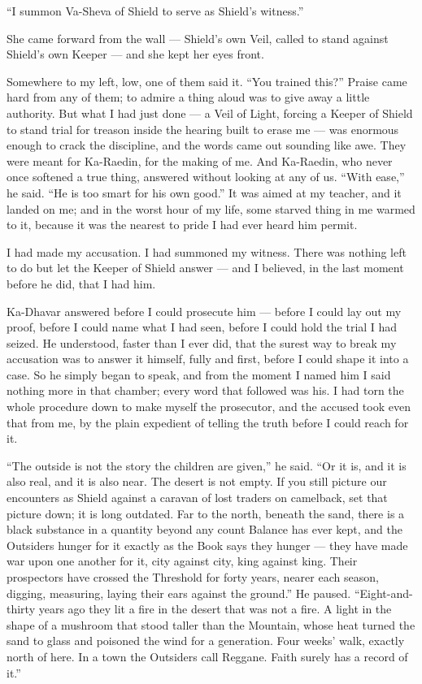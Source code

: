 ``I summon Va-Sheva of Shield to serve as Shield's witness.''\par
 
She came forward from the wall --- Shield's own Veil, called to stand against Shield's own Keeper --- and she kept her eyes front. \par
 
Somewhere to my left, low, one of them said it. ``You trained this?'' Praise came hard from any of them; to admire a thing aloud was to give away a little authority. But what I had just done --- a Veil of Light, forcing a Keeper of Shield to stand trial for treason inside the hearing built to erase me --- was enormous enough to crack the discipline, and the words came out sounding like awe. They were meant for Ka-Raedin, for the making of me. And Ka-Raedin, who never once softened a true thing, answered without looking at any of us. ``With ease,'' he said. ``He is too smart for his own good.'' It was aimed at my teacher, and it landed on me; and in the worst hour of my life, some starved thing in me warmed to it, because it was the nearest to pride I had ever heard him permit.\par

I had made my accusation. I had summoned my witness. There was nothing left to do but let the Keeper of Shield answer --- and I believed, in the last moment before he did, that I had him.\par
 
\ornament
 
Ka-Dhavar answered before I could prosecute him ---
before I could lay out my proof,
before I could name what I had seen,
before I could hold the trial I had seized.
He understood, faster than I ever did, that the surest way to break my accusation was to answer it himself, fully and first, before I could shape it into a case. 
So he simply began to speak, and from the moment I named him I said nothing more in that chamber; every word that followed was his.
I had torn the whole procedure down to make myself the prosecutor, and the accused took even that from me, by the plain expedient of telling the 
truth before I could reach for it.\par

``The outside is not the story the children are given,'' he said. ``Or it is, and it is also real, and it is also near. The desert is not empty. 
If you still picture our encounters as Shield against a caravan of lost traders on camelback, set that picture down; it is long outdated.
Far to the north, beneath the sand, there is a black substance in a quantity beyond any count Balance has ever kept, and the Outsiders hunger for 
it exactly as the Book says they hunger --- they have made war upon one another for it, city against city, king against king. 
Their prospectors have crossed the Threshold for forty years, nearer each season, digging, measuring, laying their ears against the ground.'' 
He paused. ``Eight-and-thirty years ago they lit a fire in the desert that was not a fire. A light in the shape of a mushroom
that stood taller than the Mountain, whose heat turned the sand to glass and poisoned the wind for a generation. Four weeks' walk, exactly north of here. 
In a town the Outsiders call Reggane. Faith surely has a record of it.'' 

